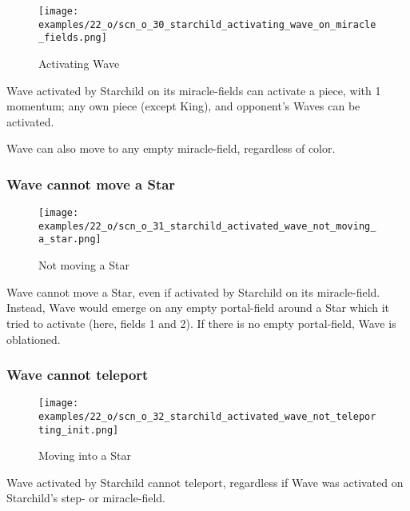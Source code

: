 \noindent
\begin{wrapfigure}[8]{l}{0.4\textwidth}
\centering
\texttt{[image: examples/22\_o/scn\_o\_30\_starchild\_activating\_wave\_on\_miracle\_fields.png]}
\caption{Activating Wave}
\label{fig:scn_o_30_starchild_activating_wave_on_miracle_fields}
\end{wrapfigure}
Wave activated by Starchild on its miracle-fields can activate a piece, with
1 momentum; any own piece (except King), and opponent's Waves can be activated.

Wave can also move to any empty miracle-field, regardless of color.

\subsubsection*{Wave cannot move a Star}
\label{sec:One/Starchild/Activating Wave/Wave cannot move a Star}

\noindent
\begin{wrapfigure}[9]{l}{0.4\textwidth}
\centering
\texttt{[image: examples/22\_o/scn\_o\_31\_starchild\_activated\_wave\_not\_moving\_a\_star.png]}
\caption{Not moving a Star}
\label{fig:scn_o_31_starchild_activated_wave_not_moving_a_star}
\end{wrapfigure}
Wave cannot move a Star, even if activated by Starchild on its miracle-field.
Instead, Wave would emerge on any empty portal-field around a Star which it tried
to activate (here, fields 1 and 2). If there is no empty portal-field, Wave is
oblationed.

\clearpage %

\subsubsection*{Wave cannot teleport}
\label{sec:One/Starchild/Activating Wave/Wave cannot teleport}

\vspace*{-0.1\baselineskip}
\noindent
\begin{wrapfigure}[4]{l}{0.4\textwidth}
\centering
\texttt{[image: examples/22\_o/scn\_o\_32\_starchild\_activated\_wave\_not\_teleporting\_init.png]}
\vspace*{-0.4\baselineskip}
\caption{Moving into a Star}
\label{fig:scn_o_32_starchild_activated_wave_not_teleporting_init}
\end{wrapfigure}
Wave activated by Starchild cannot teleport, regardless if Wave was activated on
Starchild's step- or miracle-field.

